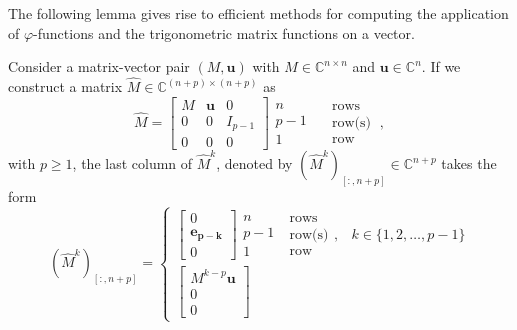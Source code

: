 The following lemma gives rise to efficient methods for computing the application of
$\varphi$-functions and the trigonometric matrix functions on a vector.
\begin{lemma}
    \label{lem:embeddedmatrixpowered}
    Consider a matrix-vector pair $(M, \mathbf{u})$ with $M \in \mathbb{C}^{n \times n}$
    and $\mathbf{u} \in \mathbb{C}^n$.
    If we construct a matrix $\hat{M} \in \mathbb{C}^{(n+p) \times (n+p)}$ as
    \begin{equation}
        \label{eq:embeddedmatrixdefinition}
        \hat{M} =
        \begin{bmatrix}
            M & \mathbf{u} & 0       \\
            0   & 0   & I_{p-1} \\
            0   & 0   & 0
        \end{bmatrix}
        \begin{matrix} n \\ p-1 \\ 1 \end{matrix}
        \begin{matrix} \quad \text{rows} \\ \quad \text{row(s)} \\ \quad \text{row} \end{matrix}
        \: ,
    \end{equation}
    with $p \ge 1$, the last column of $\hat{M}^k$, denoted by $(\hat{M}^k)_{[:, n+p]}
    \in \mathbb{C}^{n+p}$ takes the form
    \begin{equation*}
        \label{eq:embeddedmatrixpowered}
        (\hat{M}^k)_{[:, n+p]} =
        \begin{cases}
            \begin{bmatrix} 0 \\ \mathbf{e_{p-k}} \\ 0 \end{bmatrix}
            \begin{matrix} n \\ p-1 \\ 1 \end{matrix}
            \; \begin{matrix} \text{rows} \\ \text{row(s)} \\ \text{row} \end{matrix},
            & k \in \{ 1, 2, \dots, p-1 \}
            \\
            \begin{bmatrix} M^{k-p} \mathbf{u} \\ 0 \\ 0 \end{bmatrix}

\end{cases}
\end{equation*}
\end{lemma}
